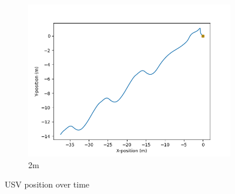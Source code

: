 \documentclass[class=article, crop=false]{standalone}
\begin{document}
\begin{figure}
\begin{subfigure}[b]{0.48\textwidth}
        \includegraphics{scenario1/rov-100m/2.0m/usv_position_uncontrolled}
        \caption{2m}
        \label{}
    \end{subfigure}

    \caption{USV position over time}
\end{figure}
\end{document}
